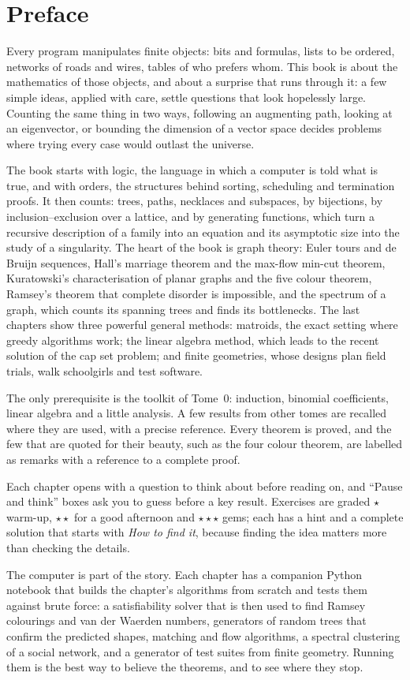 \chapter*{Preface}
Every program manipulates finite objects: bits and formulas, lists to be ordered, networks of roads and wires,
tables of who prefers whom. This book is about the mathematics of those objects, and about a surprise that runs
through it: a few simple ideas, applied with care, settle questions that look hopelessly large. Counting the same
thing in two ways, following an augmenting path, looking at an eigenvector, or bounding the dimension of a vector
space decides problems where trying every case would outlast the universe.

The book starts with logic, the language in which a computer is told what is true, and with orders, the
structures behind sorting, scheduling and termination proofs. It then counts: trees, paths, necklaces and
subspaces, by bijections, by inclusion--exclusion over a lattice, and by generating functions, which turn a
recursive description of a family into an equation and its asymptotic size into the study of a singularity. The
heart of the book is graph theory: Euler tours and de Bruijn sequences, Hall's marriage theorem and the max-flow
min-cut theorem, Kuratowski's characterisation of planar graphs and the five colour theorem, Ramsey's theorem
that complete disorder is impossible, and the spectrum of a graph, which counts its spanning trees and finds its
bottlenecks. The last chapters show three powerful general methods: matroids, the exact setting where greedy
algorithms work; the linear algebra method, which leads to the recent solution of the cap set problem; and
finite geometries, whose designs plan field trials, walk schoolgirls and test software.

The only prerequisite is the toolkit of Tome~0: induction, binomial coefficients, linear algebra and a little
analysis. A few results from other tomes are recalled where they are used, with a precise reference. Every
theorem is proved, and the few that are quoted for their beauty, such as the four colour theorem, are labelled as
remarks with a reference to a complete proof.

Each chapter opens with a question to think about before reading on, and ``Pause and think'' boxes ask you to
guess before a key result. Exercises are graded \textbf{$\star$} warm-up, \textbf{$\star\star$} for a good
afternoon and \textbf{$\star\star\star$} gems; each has a hint and a complete solution that starts with
\emph{How to find it}, because finding the idea matters more than checking the details.

The computer is part of the story. Each chapter has a companion Python notebook that builds the chapter's
algorithms from scratch and tests them against brute force: a satisfiability solver that is then used to find
Ramsey colourings and van der Waerden numbers, generators of random trees that confirm the predicted shapes,
matching and flow algorithms, a spectral clustering of a social network, and a generator of test suites from
finite geometry. Running them is the best way to believe the theorems, and to see where they stop.
